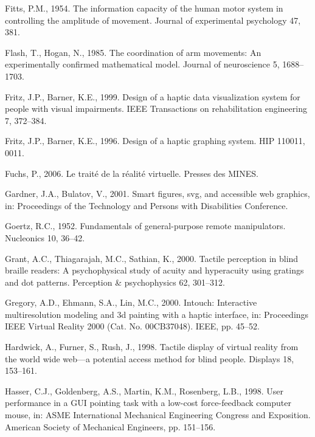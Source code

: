 \documentclass[
]{book}
\newlength{\cslhangindent}
\newlength{\cslentryspacingunit} %
\newenvironment{CSLReferences}[2] %
 {%
  \setlength{\parindent}{0pt}
  \ifodd #1
  \let\oldpar\par
  \def\par{\hangindent=\cslhangindent\oldpar}
  \fi
  \setlength{\parskip}{#2\cslentryspacingunit}
 }%
 {}
\begin{document}
\begin{CSLReferences}{1}{0}
\leavevmode{}%
Fitts, P.M., 1954. The information capacity of the human motor system in controlling the amplitude of movement. Journal of experimental psychology 47, 381.

\leavevmode{}%
Flash, T., Hogan, N., 1985. The coordination of arm movements: An experimentally confirmed mathematical model. Journal of neuroscience 5, 1688--1703.

\leavevmode{}%
Fritz, J.P., Barner, K.E., 1999. Design of a haptic data visualization system for people with visual impairments. IEEE Transactions on rehabilitation engineering 7, 372--384.

\leavevmode{}%
Fritz, J.P., Barner, K.E., 1996. Design of a haptic graphing system. HIP 110011, 0011.

\leavevmode{}%
Fuchs, P., 2006. Le trait{é} de la r{é}alit{é} virtuelle. Presses des MINES.

\leavevmode{}%
Gardner, J.A., Bulatov, V., 2001. Smart figures, svg, and accessible web graphics, in: Proceedings of the Technology and Persons with Disabilities Conference.

\leavevmode{}%
Goertz, R.C., 1952. Fundamentals of general-purpose remote manipulators. Nucleonics 10, 36--42.

\leavevmode{}%
Grant, A.C., Thiagarajah, M.C., Sathian, K., 2000. Tactile perception in blind braille readers: A psychophysical study of acuity and hyperacuity using gratings and dot patterns. Perception \& psychophysics 62, 301--312.

\leavevmode{}%
Gregory, A.D., Ehmann, S.A., Lin, M.C., 2000. Intouch: Interactive multiresolution modeling and 3d painting with a haptic interface, in: Proceedings IEEE Virtual Reality 2000 (Cat. No. 00CB37048). IEEE, pp. 45--52.

\leavevmode{}%
Hardwick, A., Furner, S., Rush, J., 1998. Tactile display of virtual reality from the world wide web---a potential access method for blind people. Displays 18, 153--161.

\leavevmode{}%
Hasser, C.J., Goldenberg, A.S., Martin, K.M., Rosenberg, L.B., 1998. User performance in a GUI pointing task with a low-cost force-feedback computer mouse, in: ASME International Mechanical Engineering Congress and Exposition. American Society of Mechanical Engineers, pp. 151--156.


\end{CSLReferences}
\end{document}
